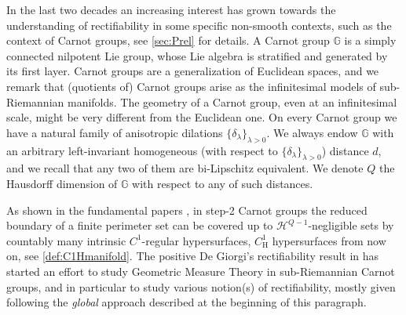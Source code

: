\documentclass[10pt, a4paper,
oneside, headinclude,footinclude]{scrartcl}
\begin{document}
In the last two decades an increasing interest has grown towards the understanding of rectifiability in some specific non-smooth contexts, such as the context of Carnot groups, see \cref{sec:Prel} for details. A Carnot group $\mathbb{G}$ is a simply connected nilpotent Lie group, whose Lie algebra is stratified and generated by its first layer. Carnot groups are a generalization of Euclidean spaces, and we remark that (quotients of) Carnot groups arise as the infinitesimal models of sub-Riemannian manifolds. The geometry of a Carnot group, even at an infinitesimal scale, might be very different from the Euclidean one. On every Carnot group we have a natural family of anisotropic dilations $\{\delta_\lambda\}_{\lambda>0}$. We always endow $\mathbb G$ with an arbitrary left-invariant homogeneous (with respect to $\{\delta_\lambda\}_{\lambda>0}$) distance $d$, and we recall that any two of them are bi-Lipschitz equivalent. We denote $Q$ the Hausdorff dimension of $\mathbb G$ with respect to any of such distances.

As shown in the fundamental papers \cite{Serapioni2001RectifiabilityGroup, step2}, in step-2 Carnot groups the reduced boundary of a finite perimeter set can be covered up to $\mathcal{H}^{Q-1}$-negligible sets by countably many intrinsic $C^1$-regular hypersurfaces, $C^1_{\mathrm{H}}$ hypersurfaces from now on, see \cref{def:C1Hmanifold}.
The positive De Giorgi's rectifiability result in \cite{Serapioni2001RectifiabilityGroup} has started an effort to study Geometric Measure Theory in sub-Riemannian Carnot groups, and in particular to study various notion(s) of rectifiability, mostly given following the \textit{global} approach described at the beginning of this paragraph. 
 
\end{document}
